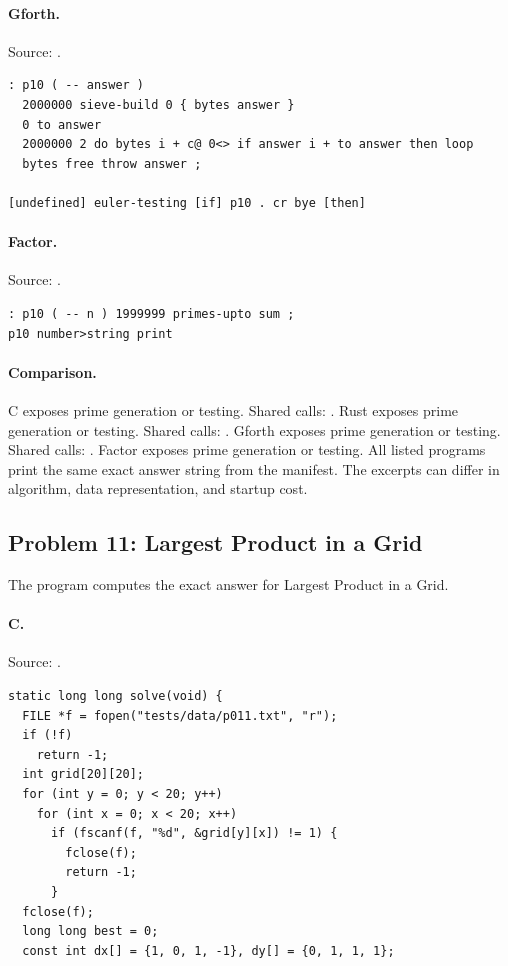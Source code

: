 \paragraph{Gforth.} Source: .
\begin{lstlisting}
: p10 ( -- answer )
  2000000 sieve-build 0 { bytes answer }
  0 to answer
  2000000 2 do bytes i + c@ 0<> if answer i + to answer then loop
  bytes free throw answer ;

[undefined] euler-testing [if] p10 . cr bye [then]
\end{lstlisting}

\paragraph{Factor.} Source: .
\begin{lstlisting}
: p10 ( -- n ) 1999999 primes-upto sum ;
p10 number>string print
\end{lstlisting}

\paragraph{Comparison.}
C exposes prime generation or testing. Shared calls: \texttt{}. Rust exposes prime generation or testing. Shared calls: \texttt{}. Gforth exposes prime generation or testing. Shared calls: \texttt{}. Factor exposes prime generation or testing.
All listed programs print the same exact answer string from the manifest. The excerpts can differ in algorithm, data representation, and startup cost.

\subsection{Problem 11: Largest Product in a Grid}
\label{walkthrough:p11}
The program computes the exact answer for Largest Product in a Grid.

\paragraph{C.} Source: .
\begin{lstlisting}
static long long solve(void) {
  FILE *f = fopen("tests/data/p011.txt", "r");
  if (!f)
    return -1;
  int grid[20][20];
  for (int y = 0; y < 20; y++)
    for (int x = 0; x < 20; x++)
      if (fscanf(f, "%d", &grid[y][x]) != 1) {
        fclose(f);
        return -1;
      }
  fclose(f);
  long long best = 0;
  const int dx[] = {1, 0, 1, -1}, dy[] = {0, 1, 1, 1};
\end{lstlisting}

